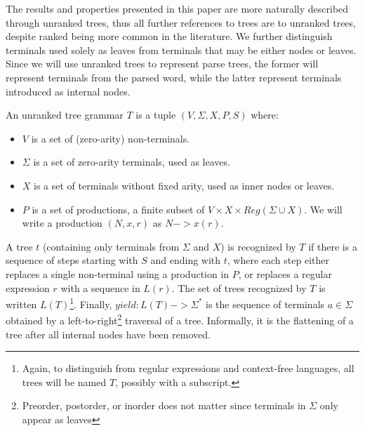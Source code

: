 \documentclass[runningheads]{llncs}
\newcommand{\NT}{V} %
\newcommand{\T}{\Sigma} %
\newcommand{\regex}{\mathit{Reg}}
\begin{document}
The results and properties presented in this paper are more naturally described through unranked trees, thus all further references to trees are to unranked trees, despite ranked being more common in the literature. We further distinguish terminals used solely as leaves from terminals that may be either nodes or leaves. Since we will use unranked trees to represent parse trees, the former will represent terminals from the parsed word, while the latter represent terminals introduced as internal nodes.

An unranked tree grammar $T$ is a tuple $(\NT, \T, X, P, S)$ where:

\begin{itemize}
\item $\NT$ is a set of (zero-arity) non-terminals.
\item $\T$ is a set of zero-arity terminals, used as leaves.
\item $X$ is a set of terminals without fixed arity, used as inner nodes or leaves.
\item $P$ is a set of productions, a finite subset of $\NT \times X \times \regex(\T \cup X)$. We will write a production $(N, x, r)$ as $N -> x(r)$.
\end{itemize}

\noindent A tree $t$ (containing only terminals from $\T$ and $X$) is recognized by $T$ if there is a sequence of steps starting with $S$ and ending with $t$, where each step either replaces a single non-terminal using a production in $P$, or replaces a regular expression $r$ with a sequence in $L(r)$. The set of trees recognized by $T$ is written $L(T)$\footnote{Again, to distinguish from regular expressions and context-free languages, all trees will be named $T$, possibly with a subscript.}. Finally, $yield : L(T) -> \T^{*}$ is the sequence of terminals $a \in \T$ obtained by a left-to-right\footnote{Preorder, postorder, or inorder does not matter since terminals in $\T$ only appear as leaves} traversal of a tree. Informally, it is the flattening of a tree after all internal nodes have been removed.
\end{document}
